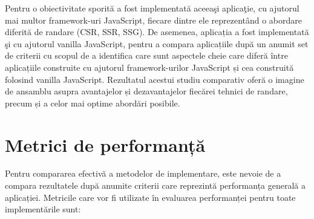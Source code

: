\documentclass[12pt, a4paper]{report}
\begin{document}
Pentru o obiectivitate sporită a fost implementată aceea\c si aplica\c tie, cu ajutorul mai multor framework-uri JavaScript, fiecare dintre ele reprezent\^and o abordare diferit\u a de randare (CSR, SSR, SSG). De asemenea, aplicația a fost implementat\u a \c si cu ajutorul vanilla JavaScript, pentru a compara aplicațiile dup\u a un anumit set de criterii cu scopul de a identifica care sunt aspectele cheie care diferă între aplicațiile construite cu ajutorul framework-urilor JavaScript și cea construită folosind vanilla JavaScript. Rezultatul acestui studiu comparativ ofer\u a o imagine de ansamblu asupra avantajelor și dezavantajelor fiecărei tehnici de randare, precum și a celor mai optime abordări posibile.


\section{Metrici de performanță}

Pentru compararea efectivă a metodelor de implementare, este nevoie de a compara rezultatele după anumite criterii care reprezintă performanța generală a aplicației.
Metricile care vor fi utilizate în evaluarea performanței pentru toate implementările sunt:
\end{document}
